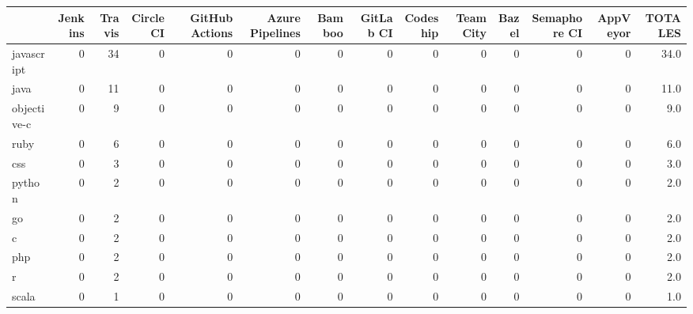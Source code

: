 \begin{tabular}{lrrrrrrrrrrrrr}
\toprule
{} &  Jenkins &  Travis &  Circle CI &  GitHub Actions &  Azure Pipelines &  Bamboo &  GitLab CI &  Codeship &  TeamCity &  Bazel &  Semaphore CI &  AppVeyor &  TOTALES \\
\midrule
javascript   &        0 &      34 &          0 &               0 &                0 &       0 &          0 &         0 &         0 &      0 &             0 &         0 &     34.0 \\
java         &        0 &      11 &          0 &               0 &                0 &       0 &          0 &         0 &         0 &      0 &             0 &         0 &     11.0 \\
objective-c  &        0 &       9 &          0 &               0 &                0 &       0 &          0 &         0 &         0 &      0 &             0 &         0 &      9.0 \\
ruby         &        0 &       6 &          0 &               0 &                0 &       0 &          0 &         0 &         0 &      0 &             0 &         0 &      6.0 \\
css          &        0 &       3 &          0 &               0 &                0 &       0 &          0 &         0 &         0 &      0 &             0 &         0 &      3.0 \\
python       &        0 &       2 &          0 &               0 &                0 &       0 &          0 &         0 &         0 &      0 &             0 &         0 &      2.0 \\
go           &        0 &       2 &          0 &               0 &                0 &       0 &          0 &         0 &         0 &      0 &             0 &         0 &      2.0 \\
c            &        0 &       2 &          0 &               0 &                0 &       0 &          0 &         0 &         0 &      0 &             0 &         0 &      2.0 \\
php          &        0 &       2 &          0 &               0 &                0 &       0 &          0 &         0 &         0 &      0 &             0 &         0 &      2.0 \\
r            &        0 &       2 &          0 &               0 &                0 &       0 &          0 &         0 &         0 &      0 &             0 &         0 &      2.0 \\
scala        &        0 &       1 &          0 &               0 &                0 &       0 &          0 &         0 &         0 &      0 &             0 &         0 &      1.0 \\

\end{tabular}
